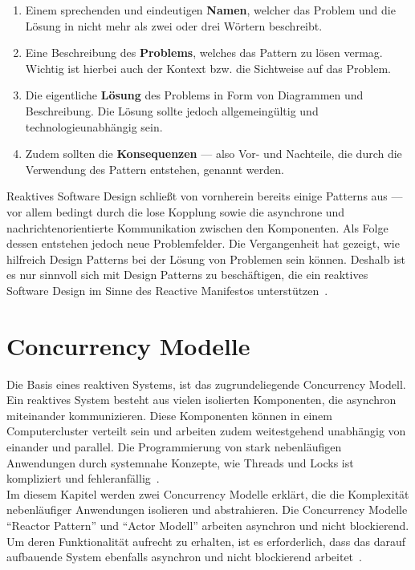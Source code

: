 \begin{enumerate}
\item Einem sprechenden und eindeutigen \textbf{Namen}, welcher das Problem und die Lösung in nicht mehr als zwei oder drei Wörtern beschreibt.
\item Eine Beschreibung des \textbf{Problems}, welches das Pattern zu lösen vermag. Wichtig ist hierbei auch der Kontext bzw. die Sichtweise auf das Problem.
\item Die eigentliche \textbf{Lösung} des Problems in Form von Diagrammen und Beschreibung. Die Lösung sollte jedoch allgemeingültig und technologieunabhängig sein.
\item Zudem sollten die \textbf{Konsequenzen} --- also Vor- und Nachteile, die durch die Verwendung des Pattern entstehen, genannt werden.
\end{enumerate}

Reaktives Software Design schließt von vornherein bereits einige Patterns aus --- vor allem bedingt durch die lose Kopplung sowie die asynchrone und nachrichtenorientierte Kommunikation zwischen den Komponenten. Als Folge dessen entstehen jedoch neue Problemfelder. Die Vergangenheit hat gezeigt, wie hilfreich Design Patterns bei der Lösung von Problemen sein können. Deshalb ist es nur sinnvoll sich mit Design Patterns zu beschäftigen, die ein reaktives Software Design im Sinne des Reactive Manifestos unterstützen~\cite[S.~54]{kuhn_reactive_2015}.

\pagebreak

\section{Concurrency Modelle}
Die Basis eines reaktiven Systems, ist das zugrundeliegende Concurrency Modell. Ein reaktives System besteht aus vielen isolierten Komponenten, die asynchron miteinander kommunizieren. Diese Komponenten können in einem Computercluster verteilt sein und arbeiten zudem weitestgehend unabhängig von einander und parallel. Die Programmierung von stark nebenläufigen Anwendungen durch systemnahe Konzepte, wie Threads und Locks ist kompliziert und fehleranfällig~\cite[S.~72]{erb_concurrent_2012}.\\
Im diesem Kapitel werden zwei Concurrency Modelle erklärt, die die Komplexität nebenläufiger Anwendungen isolieren und abstrahieren. Die Concurrency Modelle \enquote{Reactor Pattern} und \enquote{Actor Modell} arbeiten asynchron und nicht blockierend. Um deren Funktionalität aufrecht zu erhalten, ist es erforderlich, dass das darauf aufbauende System ebenfalls asynchron und nicht blockierend arbeitet~\cite[S.~171]{kuhn_reactive_2015}.

